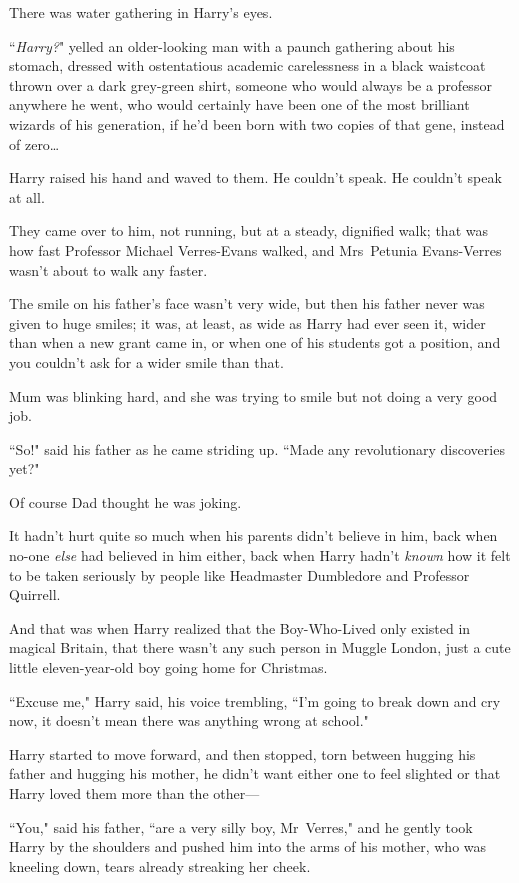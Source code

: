There was water gathering in Harry's eyes.

``\emph{Harry?}" yelled an older-looking man with a paunch gathering about his stomach, dressed with ostentatious academic carelessness in a black waistcoat thrown over a dark grey-green shirt, someone who would always be a professor anywhere he went, who would certainly have been one of the most brilliant wizards of his generation, if he'd been born with two copies of that gene, instead of zero…

Harry raised his hand and waved to them. He couldn't speak. He couldn't speak at all.

They came over to him, not running, but at a steady, dignified walk; that was how fast Professor Michael Verres-Evans walked, and Mrs~Petunia Evans-Verres wasn't about to walk any faster.

The smile on his father's face wasn't very wide, but then his father never was given to huge smiles; it was, at least, as wide as Harry had ever seen it, wider than when a new grant came in, or when one of his students got a position, and you couldn't ask for a wider smile than that.

Mum was blinking hard, and she was trying to smile but not doing a very good job.

``So!" said his father as he came striding up. ``Made any revolutionary discoveries yet?"

Of course Dad thought he was joking.

It hadn't hurt quite so much when his parents didn't believe in him, back when no-one \emph{else} had believed in him either, back when Harry hadn't \emph{known} how it felt to be taken seriously by people like Headmaster Dumbledore and Professor Quirrell.

And that was when Harry realized that the Boy-Who-Lived only existed in magical Britain, that there wasn't any such person in Muggle London, just a cute little eleven-year-old boy going home for Christmas.

``Excuse me," Harry said, his voice trembling, ``I'm going to break down and cry now, it doesn't mean there was anything wrong at school."

Harry started to move forward, and then stopped, torn between hugging his father and hugging his mother, he didn't want either one to feel slighted or that Harry loved them more than the other—

``You," said his father, ``are a very silly boy, Mr~Verres," and he gently took Harry by the shoulders and pushed him into the arms of his mother, who was kneeling down, tears already streaking her cheek.


